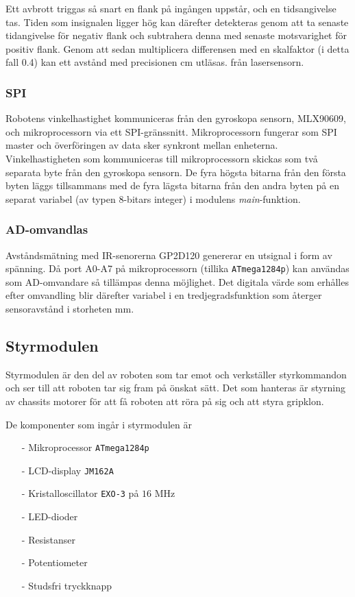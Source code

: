 \documentclass[11pt]{article}
\begin{document}
\begin{flushleft}
Ett avbrott triggas så snart en flank på ingången uppstår, och en tidsangivelse tas. Tiden som insignalen ligger hög kan därefter detekteras genom att ta senaste tidangivelse för negativ flank och subtrahera denna med senaste motsvarighet för positiv flank. Genom att sedan multiplicera differensen med en skalfaktor (i detta fall 0.4) kan ett avstånd med precisionen cm utläsas. från lasersensorn. 

\subsubsection{SPI}
Robotens vinkelhastighet kommuniceras från den gyroskopa sensorn, MLX90609, och mikroprocessorn via ett SPI-gränssnitt. Mikroprocessorn fungerar som SPI master och överföringen av data sker synkront mellan enheterna. Vinkelhastigheten som kommuniceras till mikroprocessorn skickas som två separata byte från den gyroskopa sensorn. De fyra högsta bitarna från den första byten läggs tillsammans med de fyra lägsta bitarna från den andra byten på en separat variabel (av typen 8-bitars integer) i modulens \textit{main}-funktion. 

\subsubsection{AD-omvandlas}
Avståndsmätning med IR-senorerna GP2D120 genererar en utsignal i form av spänning. Då port A0-A7 på mikroprocessorn (tillika \verb+ATmega1284p+) kan användas som AD-omvandare så tillämpas denna möjlighet. Det digitala värde som erhålles efter omvandling blir därefter variabel i en tredjegradsfunktion som återger sensoravstånd i storheten mm.


\subsection{Styrmodulen}

Styrmodulen är den del av roboten som tar emot och verkställer styrkommandon och ser till att roboten tar sig fram på önskat sätt. Det som hanteras är styrning av chassits motorer för att få roboten att röra på sig och att styra gripklon. 

De komponenter som ingår i styrmodulen är
\begin{itemize}
  \item[-] Mikroprocessor \verb+ATmega1284p+
  \item[-] LCD-display \verb+JM162A+
  \item[-] Kristalloscillator \verb+EXO-3+ på $16$ MHz
  \item[-] LED-dioder
  \item[-] Resistanser
  \item[-] Potentiometer
  \item[-] Studsfri tryckknapp
\end{itemize}


\end{flushleft}
\end{document}
